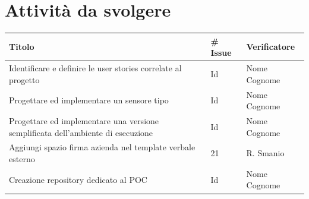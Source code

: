 \documentclass{article}
\begin{document}
\section{Attività da svolgere}  %
    \begin{center}
        \begin{tabular}{|C{7cm}|C{1,5cm}|C{3cm}|} 
            \hline
            \textbf{Titolo} & \textbf{\# Issue} & \textbf{Verificatore} \\ \hline\hline
            Identificare e definire le user stories correlate al progetto & Id & Nome Cognome \\
            Progettare ed implementare un sensore tipo & Id & Nome Cognome \\
            Progettare ed implementare una versione semplificata dell'ambiente di esecuzione & Id & Nome Cognome \\
            Aggiungi spazio firma azienda nel template verbale esterno & 21 & R. Smanio \\
            Creazione repository dedicato al POC & Id & Nome Cognome \\
            \hline
        \end{tabular}
    \end{center}
\end{document}
